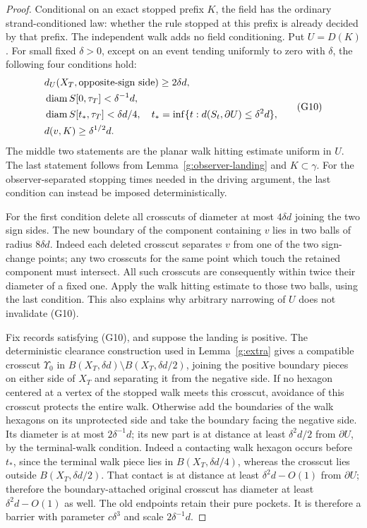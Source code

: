 \begin{proof}
Conditional on an exact stopped prefix \(K\), the field has the
ordinary strand-conditioned law: whether the rule stopped at this
prefix is already decided by that prefix. The independent walk
adds no field conditioning. Put \(U=D(K)\).
For small fixed \(\delta>0\), except on an event tending uniformly
to zero with \(\delta\), the following four conditions hold:
\[
\begin{split}
 &d_U(X_T,\hbox{opposite-sign side})\geq2\delta d,\\
 &\operatorname{diam} S[0,\tau_T]<\delta^{-1}d,\\
 &\operatorname{diam} S[t_*,\tau_T]<\delta d/4,
 \quad t_*=\inf\{t:d(S_t,\partial U)\leq\delta^2d\},\\
 &d(v,K)\geq\delta^{1/2}d.
\end{split}                                                   \tag{G10}
\]
The middle two statements are the planar walk hitting estimate
uniform in \(U\). The last statement follows from
Lemma~\ref{g:observer-landing} and \(K\subset\gamma\).
For the observer-separated stopping times needed in the driving
argument, the last condition can instead be imposed deterministically.

For the first condition delete all crosscuts of diameter at most
\(4\delta d\) joining the two sign sides. The new boundary of the
component containing \(v\) lies in two balls of radius \(8\delta d\).
Indeed each deleted crosscut separates \(v\) from one of the two
sign-change points; any two crosscuts for the same point which
touch the retained component must intersect. All such crosscuts
are consequently within twice their diameter of a fixed one.
Apply the walk hitting estimate to those two balls, using the last
condition. This also explains why arbitrary narrowing of \(U\)
does not invalidate (G10).

Fix records satisfying (G10), and suppose the landing is positive.
The deterministic clearance construction used in
Lemma~\ref{g:extra} gives a compatible crosscut \(\Upsilon_0\)
in \(B(X_T,\delta d)\setminus B(X_T,\delta d/2)\), joining the
positive boundary pieces on either side of \(X_T\) and separating
it from the negative side. If no hexagon centered at a vertex of the
stopped walk meets this crosscut,
avoidance of this crosscut protects the entire walk.
Otherwise add the boundaries of the walk hexagons on its
unprotected side and take the boundary facing the negative side.
Its diameter is at most \(2\delta^{-1}d\); its new part is at
distance at least \(\delta^2d/2\) from \(\partial U\), by the
terminal-walk condition. Indeed a contacting walk hexagon occurs
before \(t_*\), since the terminal walk piece lies in
\(B(X_T,\delta d/4)\), whereas the crosscut lies outside
\(B(X_T,\delta d/2)\). That contact is at distance at least \(\delta^2d-O(1)\)
from \(\partial U\); therefore the boundary-attached original
crosscut has diameter at least \(\delta^2d-O(1)\) as well. The old endpoints retain their pure
pockets. It is therefore a barrier with parameter \(c\delta^3\)
and scale \(2\delta^{-1}d\).


\end{proof}
